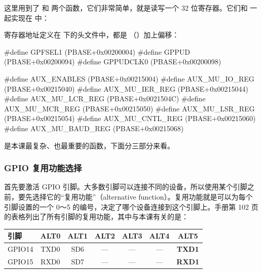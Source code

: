 这里用到了  和  两个函数，它们非常简单，就是读写一个 32 位寄存器。它们和  一起实现在  中：


寄存器地址定义在  下的头文件中，都是 （）加上偏移：

\begin{ccode}
#define GPFSEL1         (PBASE+0x00200004)
#define GPPUD           (PBASE+0x00200094)
#define GPPUDCLK0       (PBASE+0x00200098)

#define AUX_ENABLES     (PBASE+0x00215004)
#define AUX_MU_IO_REG   (PBASE+0x00215040)
#define AUX_MU_IER_REG  (PBASE+0x00215044)
#define AUX_MU_LCR_REG  (PBASE+0x0021504C)
#define AUX_MU_MCR_REG  (PBASE+0x00215050)
#define AUX_MU_LSR_REG  (PBASE+0x00215054)
#define AUX_MU_CNTL_REG (PBASE+0x00215060)
#define AUX_MU_BAUD_REG (PBASE+0x00215068)
\end{ccode}

 是本课最复杂、也最重要的函数，下面分三部分来看。

\subsubsection{GPIO 复用功能选择}

首先要激活 GPIO 引脚。大多数引脚可以连接不同的设备，所以使用某个引脚之前，要先选择它的“复用功能”（alternative function）。复用功能就是可以为每个引脚设置的一个 0～5 的编号，决定了哪个设备连接到这个引脚上。手册第 102 页的表格列出了所有引脚的复用功能，其中与本课有关的是：

\begin{center}
  \small
  \begin{tabular}{@{}lcccccc@{}}
    \toprule
    引脚 & ALT0 & ALT1 & ALT2 & ALT3 & ALT4 & ALT5 \\
    \midrule
    GPIO14 & TXD0 & SD6 & — & — & — & \textbf{TXD1} \\
    GPIO15 & RXD0 & SD7 & — & — & — & \textbf{RXD1} \\
    \bottomrule
  \end{tabular}
\end{center}


